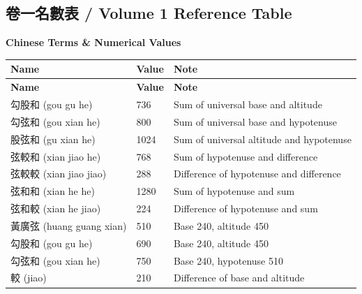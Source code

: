 \documentclass[11pt,a4paper]{article}
\begin{document}
\clearpage

\subsection*{卷一名數表 / Volume 1 Reference Table}

\begin{center}
\textbf{Chinese Terms \& Numerical Values}
\end{center}

\begin{center}
\begin{longtable}{|l|l|l|}
\hline
\textbf{Name} & \textbf{Value} & \textbf{Note} \\
\hline
\endfirsthead
\hline
\textbf{Name} & \textbf{Value} & \textbf{Note} \\
\hline
\endhead
勾股和 (gou gu he) & 736 & Sum of universal base and altitude \\
\hline
勾弦和 (gou xian he) & 800 & Sum of universal base and hypotenuse \\
\hline
股弦和 (gu xian he) & 1024 & Sum of universal altitude and hypotenuse \\
\hline
弦較和 (xian jiao he) & 768 & Sum of hypotenuse and difference \\
\hline
弦較較 (xian jiao jiao) & 288 & Difference of hypotenuse and difference \\
\hline
弦和和 (xian he he) & 1280 & Sum of hypotenuse and sum \\
\hline
弦和較 (xian he jiao) & 224 & Difference of hypotenuse and sum \\
\hline
黃廣弦 (huang guang xian) & 510 & Base 240, altitude 450 \\
\hline
勾股和 (gou gu he) & 690 & Base 240, altitude 450 \\
\hline
勾弦和 (gou xian he) & 750 & Base 240, hypotenuse 510 \\
\hline
較 (jiao) & 210 & Difference of base and altitude \\
\hline
\end{longtable}
\end{center}

\clearpage

\end{document}
